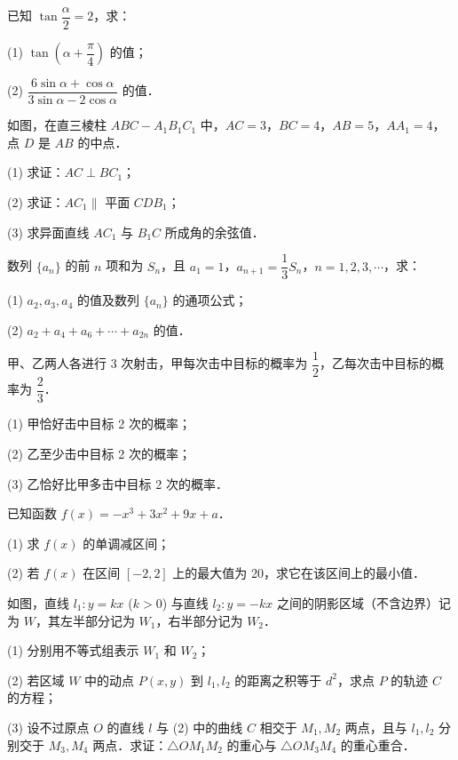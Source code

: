 \begin{question}
已知 $\tan\dfrac{\alpha}{2} = 2$，求：

(1) $\tan\left(\alpha + \dfrac{\pi}{4}\right)$ 的值；

(2) $\dfrac{6\sin\alpha + \cos\alpha}{3\sin\alpha - 2\cos\alpha}$ 的值．

\Needspace{0.4\textheight}
\end{question}
\begin{question}
如图，在直三棱柱 $ABC - A_1B_1C_1$ 中，$AC = 3$，$BC = 4$，$AB = 5$，$AA_1 = 4$，点 $D$ 是 $AB$ 的中点．
\nopagebreak[4]
\begin{center}\end{center}
\nopagebreak[4]
(1) 求证：$AC \perp BC_1$；

(2) 求证：$AC_1 \parallel$ 平面 $CDB_1$；

(3) 求异面直线 $AC_1$ 与 $B_1C$ 所成角的余弦值．

\end{question}
\begin{question}
数列 $\{a_n\}$ 的前 $n$ 项和为 $S_n$，且 $a_1 = 1$，$a_{n+1} = \dfrac{1}{3}S_n$，$n = 1, 2, 3, \cdots$，求：

(1) $a_2, a_3, a_4$ 的值及数列 $\{a_n\}$ 的通项公式；

(2) $a_2 + a_4 + a_6 + \cdots + a_{2n}$ 的值．

\end{question}
\begin{question}
甲、乙两人各进行 3 次射击，甲每次击中目标的概率为 $\dfrac{1}{2}$，乙每次击中目标的概率为 $\dfrac{2}{3}$．

(1) 甲恰好击中目标 2 次的概率；

(2) 乙至少击中目标 2 次的概率；

(3) 乙恰好比甲多击中目标 2 次的概率．

\end{question}
\begin{question}
已知函数 $f(x) = -x^3 + 3x^2 + 9x + a$．

(1) 求 $f(x)$ 的单调减区间；

(2) 若 $f(x)$ 在区间 $[-2, 2]$ 上的最大值为 20，求它在该区间上的最小值．

\Needspace{0.4\textheight}
\end{question}
\begin{question}
如图，直线 $l_1: y = kx$ ($k > 0$) 与直线 $l_2: y = -kx$ 之间的阴影区域（不含边界）记为 $W$，其左半部分记为 $W_1$，右半部分记为 $W_2$．
\nopagebreak[4]
\begin{center}\end{center}
\nopagebreak[4]
(1) 分别用不等式组表示 $W_1$ 和 $W_2$；

(2) 若区域 $W$ 中的动点 $P(x, y)$ 到 $l_1, l_2$ 的距离之积等于 $d^2$，求点 $P$ 的轨迹 $C$ 的方程；

(3) 设不过原点 $O$ 的直线 $l$ 与 (2) 中的曲线 $C$ 相交于 $M_1, M_2$ 两点，且与 $l_1, l_2$ 分别交于 $M_3, M_4$ 两点．求证：$\triangle OM_1M_2$ 的重心与 $\triangle OM_3M_4$ 的重心重合．

\end{question}
